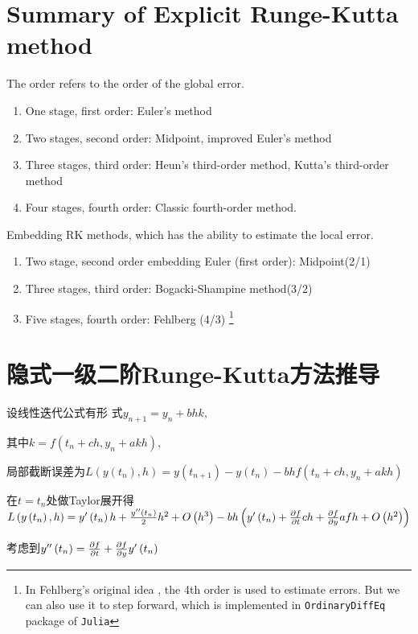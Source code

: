 \documentclass{ctexart}
\begin{document}
\section{Summary of Explicit Runge-Kutta method}
The order refers to the order of the global error.
\begin{enumerate}
\item One stage, first order: Euler's method
\item Two stages, second order: Midpoint, improved Euler's method \cite{heun}
\item Three stages, third order: Heun's third-order method, Kutta's third-order method
\item Four stages, fourth order: Classic fourth-order method.
\end{enumerate}
Embedding RK methods, which has the ability to estimate the local error.
\begin{enumerate}
    \item Two stage, second order embedding Euler (first order): Midpoint(2/1)
    \item Three stages, third order: Bogacki-Shampine method(3/2)
    \item Five stages, fourth order: Fehlberg (4/3) \footnote{In Fehlberg's original idea
    \cite{fehlberg}, the 4th order is used to estimate
    errors. But we can also use it to step forward, which is implemented in \texttt{OrdinaryDiffEq} package of \texttt{Julia} }
\end{enumerate}
    

\section{隐式一级二阶Runge-Kutta方法推导}

设线性迭代公式有形%
式$y_{n+1}=y_{n}+bhk,$

其中$k=f\left( t_{n}+ch,y_{n}+akh\right) ,$

局部截断误差为$L\left( y\left(
t_{n}\right) ,h\right) =y\left( t_{n+1}\right) -y\left( t_{n}\right)
-bhf\left( t_{n}+ch,y_{n}+akh\right) $

在$t=t_{n}$处做Taylor展开得$L\left(
y\left( t_{n}\right) ,h\right) =y^{\prime }\left( t_{n}\right) h+\frac{%
y^{\prime \prime }\left( t_{n}\right) }{2}h^{2}+O\left( h^{3}\right)
-bh\left( y^{\prime }\left( t_{n}\right) +\frac{\partial f}{\partial t}ch+%
\frac{\partial f}{\partial y}afh+O\left( h^{2}\right) \right) $

考虑到$y^{\prime \prime }\left( t_{n}\right) =\frac{%
\partial f}{\partial t}+\frac{\partial f}{\partial y}y^{\prime }\left(
t_{n}\right) $
\end{document}
